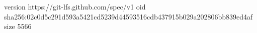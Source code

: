 version https://git-lfs.github.com/spec/v1
oid sha256:02c0d5c291d593a5421cd5239d44593516cdb437915b029a202806bb839ed4af
size 5566
